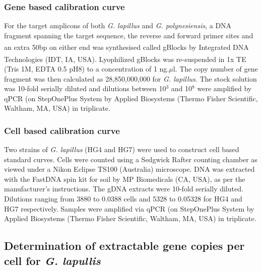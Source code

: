 \documentclass[12pt]{article}
\begin{document}
\subsubsection*{Gene based calibration curve}
For the target amplicons of both \emph{G. lapillus} and \emph{G. polynesiensis}, a DNA fragment spanning the target sequence, the reverse and forward primer sites and an extra 50bp on either end was synthesised called gBlocks \textsuperscript{\textregistered} by Integrated DNA Technologies (IDT, IA, USA). 
Lyophilized gBlocks \textsuperscript{\textregistered} was re-suspended in 1x TE (Tris 1M, EDTA 0.5 pH8) to a concentration of 1 ng.$\mu$l. 
The copy number of gene fragment was then calculated as 28,850,000,000 
for \textit{G. lapillus}. 
The stock solution was 10-fold serially diluted and dilutions between 10$^{3}$ and 10$^{8}$ were amplified by qPCR 
(on StepOnePlus System by Applied Biosystems (Thermo Fisher Scientific, Waltham, MA, USA) in triplicate.


\subsubsection*{Cell based calibration curve}
Two strains of \emph{G. lapillus} (HG4 and HG7) 
were used to construct cell based standard curves. 
Cells were counted using a Sedgwick Rafter counting chamber as viewed under a Nikon Eclipse TS100 (Australia) microscope. 
DNA was extracted with the FastDNA spin kit for soil by MP Biomedicals (CA, USA), as per the manufacturer's instructions. 
The gDNA extracts were 10-fold serially diluted. 
Dilutions ranging from 3880 to 0.0388 cells and 5328 to 0.05328  for HG4 and HG7 respectively.  
Samples were amplified via qPCR (on StepOnePlus System by Applied Biosystems (Thermo Fisher Scientific, Waltham, MA, USA) %
in triplicate.

\subsection*{Determination of extractable gene copies per cell for \emph{G. lapullis}}%
\end{document}
